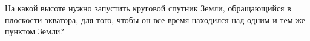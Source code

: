 На какой высоте нужно запустить круговой спутник Земли, обращающийся в плоскости экватора, 
для того, чтобы он все время находился над одним и тем же пунктом Земли?
